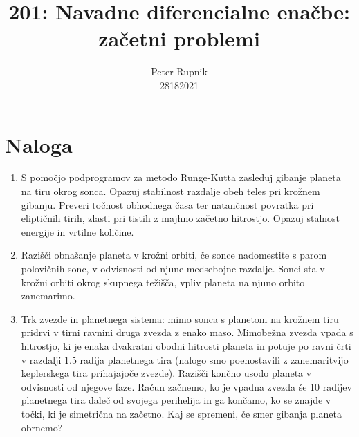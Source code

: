 \documentclass[a4paper,oneside,12pt]{article}
\title{201: Navadne diferencialne enačbe: začetni problemi}
\author{Peter Rupnik\\28182021}
\begin{document}
\maketitle
\section{Naloga}
\begin{enumerate}

\item S pomočjo podprogramov za metodo Runge-Kutta zasleduj gibanje
  planeta na tiru okrog sonca. Opazuj stabilnost razdalje obeh teles
  pri krožnem gibanju. Preveri točnost obhodnega časa ter  
  natančnost povratka pri eliptičnih tirih, zlasti pri tistih z majhno
  začetno hitrostjo. Opazuj stalnost energije in vrtilne količine.

\item Razišči obnašanje planeta v krožni orbiti,
  če sonce nadomestite s parom polovičnih sonc,
  v odvisnosti od njune medsebojne razdalje.
  Sonci sta v krožni orbiti okrog skupnega težišča, vpliv planeta na njuno
  orbito zanemarimo.

\item Trk zvezde in planetnega sistema: mimo sonca s planetom na
  krožnem tiru pridrvi v tirni ravnini druga zvezda z enako
  maso. Mimobežna zvezda vpada s hitrostjo, ki je enaka dvakratni
  obodni hitrosti planeta in potuje po ravni črti v razdalji 1.5
  radija planetnega tira (nalogo smo poenostavili z zanemaritvijo
  keplerskega tira prihajajoče zvezde).  Razišči končno usodo planeta
  v odvisnosti od njegove faze. Račun začnemo, ko je vpadna zvezda še
  10 radijev planetnega tira daleč od svojega perihelija in ga
  končamo, ko se znajde v točki, ki je simetrična na začetno. Kaj se
  spremeni, če smer gibanja planeta obrnemo?

  
\end{enumerate}


\end{document}
